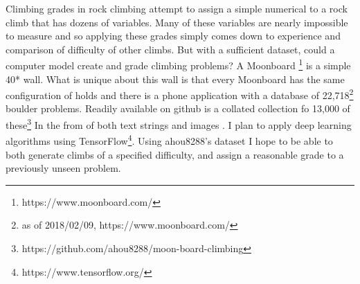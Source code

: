 \documentclass[12pt]{article}
\begin{document}
	\maketitle
	
	\begin{flushleft}
		Climbing grades in rock climbing attempt to assign a simple numerical to a rock climb that has dozens of variables. Many of these variables are nearly impossible to measure and so applying these grades simply comes down to experience and comparison of difficulty of other climbs. But with a sufficient dataset, could a computer model create and grade climbing problems? A Moonboard \footnote{https://www.moonboard.com/} is a simple 40* wall. What is unique about this wall is that every Moonboard has the same configuration of holds and there is a                   phone application with a database of 22,718\footnote{as of 2018/02/09, https://www.moonboard.com/} boulder problems. Readily available on github is a collated collection fo 13,000 of these\footnote{https://github.com/ahou8288/moon-board-climbing} In the from of both text strings and images
		. I plan to apply deep learning algorithms using TensorFlow\footnote{https://www.tensorflow.org/}. Using ahou8288's dataset I hope to be able to both generate climbs of a specified difficulty, and assign a reasonable grade to a previously unseen problem.

	\end{flushleft}
\end{document}
